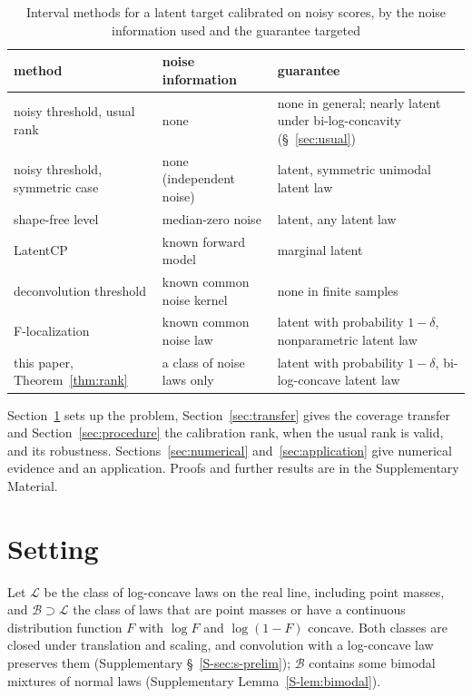 \documentclass[12pt]{article}
\theoremstyle{definition}
\newcommand{\LC}{\mathcal{L}}
\newcommand{\B}{\mathcal{B}}
\begin{document}
\begin{table}[htbp]
\renewcommand{\baselinestretch}{1}
\caption{Interval methods for a latent target calibrated on noisy scores, by the noise information used and the guarantee targeted}
\label{tab:methods}
\centering
\fontsize{9}{11pt}\selectfont
\begin{tabular}{p{4.1cm}p{3.6cm}p{4.3cm}}
\toprule
method & noise information & guarantee \\
\midrule
noisy threshold, usual rank & none & none in general; nearly latent under bi-log-concavity (\S~\ref{sec:usual}) \\
noisy threshold, symmetric case \citep{anderson1955, einbinder2024} & none (independent noise) & latent, symmetric unimodal latent law \\
shape-free level \citep{guille2024} & median-zero noise & latent, any latent law \\
LatentCP \citep*{zheng2026} & known forward model & marginal latent \\
deconvolution threshold \citep*{cohen2025} & known common noise kernel & none in finite samples \\
F-localization \citep*{ignatiadis2022} & known common noise law & latent with probability $1 - \delta$, nonparametric latent law \\
this paper, Theorem~\ref{thm:rank} & a class of noise laws only & latent with probability $1 - \delta$, bi-log-concave latent law \\
\bottomrule
\end{tabular}
\end{table}

Section~\ref{sec:setting} sets up the problem, Section~\ref{sec:transfer} gives the coverage transfer and Section~\ref{sec:procedure} the calibration rank, when the usual rank is valid, and its robustness. Sections~\ref{sec:numerical} and~\ref{sec:application} give numerical evidence and an application. Proofs and further results are in the Supplementary Material.

\section{Setting}\label{sec:setting}

Let $\LC$ be the class of log-concave laws on the real line, including point masses, and $\B \supset \LC$ the class of laws that are point masses or have a continuous distribution function $F$ with $\log F$ and $\log(1 - F)$ concave. Both classes are closed under translation and scaling, and convolution with a log-concave law preserves them (Supplementary \S~\ref{S-sec:s-prelim}); $\B$ contains some bimodal mixtures of normal laws (Supplementary Lemma~\ref{S-lem:bimodal}).
\end{document}
